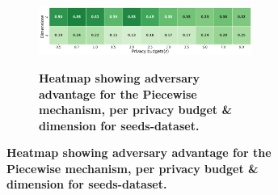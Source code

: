 \begin{figure}[H]
\begin{subfigure}[b]{0.85\textwidth}
    \begin{subfigure}[c]{1\textwidth}
      \caption{\textbf{Heatmap showing adversary advantage for the Piecewise mechanism, per privacy budget \& dimension for seeds-dataset.}}
      \includegraphics[width=1\textwidth]{Results/kd-laplace/piecewise/circle-dataset/shokri_mi_adv.png}
      \label{fig:privacy_circle-dataset_adversial_advantage_piecewise}
    \end{subfigure}
  \end{subfigure}
  \hfill %
  \begin{subfigure}[b]{0.075\textwidth}

\end{subfigure}
\end{figure}
